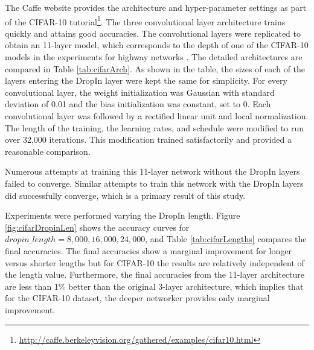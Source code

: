 \documentclass[10pt,twocolumn,letterpaper]{article}
\newcommand{\dropin}{DropIn }
\begin{document}
The Caffe \cite{Caffe14} website provides the architecture and hyper-parameter settings as part of the CIFAR-10 tutorial\footnote{\url{http://caffe.berkeleyvision.org/gathered/examples/cifar10.html}}.
The three convolutional layer architecture trains quickly and attains good accuracies.
The convolutional layers were replicated to obtain an 11-layer model, which corresponds to the depth of one of the CIFAR-10 models in the experiments for highway networks \cite{srivastava2015training}. 
The detailed architectures are compared in Table \ref{tab:cifarArch}.
As shown in the table, the sizes of each of the layers entering the \dropin layer were kept the same for simplicity.
For every convolutional layer, the weight initialization was Gaussian with standard deviation of 0.01 and the bias initialization was constant, set to 0.
Each convolutional layer was followed by a rectified linear unit and local normalization.
The length of the training, the learning rates, and schedule were modified to run over 32,000 iterations.
This modification trained satisfactorily and provided a reasonable comparison.

Numerous attempts at training this 11-layer network without the \dropin layers failed to converge.
Similar attempts to train this network with the \dropin layers did successfully converge, which is a primary result of this study.

Experiments were performed varying the \dropin length.
Figure \ref{fig:cifarDropinLen} shows the accuracy curves for $ dropin\_length = 8,000, 16,000, 24,000$,  and Table \ref{tab:cifarLengths} compares the final accuracies.
The final accuracies show a marginal improvement for longer versus shorter lengths but for CIFAR-10 the results are relatively independent of the length value.
Furthermore, the final accuracies from the 11-layer architecture are less than 1\% better than the original 3-layer architecture, which implies that for the CIFAR-10 dataset, the deeper networker  provides  only marginal improvement.



\end{document}
